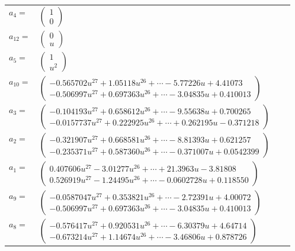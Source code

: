 \documentclass[1p]{elsarticle_modified}
\theoremstyle{definition}
\begin{document}
\begin{tabular}{m{7pt} m{180pt} m{7pt} m{180pt} }
\flushright $a_{4}=$&$\begin{pmatrix}1\\0\end{pmatrix}$ \\
\flushright $a_{12}=$&$\begin{pmatrix}0\\u\end{pmatrix}$ \\
\flushright $a_{5}=$&$\begin{pmatrix}1\\u^2\end{pmatrix}$ \\
\flushright $a_{10}=$&$\begin{pmatrix}-0.565702 u^{27}+1.05118 u^{26}+\cdots-5.77226 u+4.41073\\-0.506997 u^{27}+0.697363 u^{26}+\cdots-3.04835 u+0.410013\end{pmatrix}$ \\
\flushright $a_{3}=$&$\begin{pmatrix}-0.104193 u^{27}+0.658612 u^{26}+\cdots-9.55638 u+0.700265\\-0.0157737 u^{27}+0.222925 u^{26}+\cdots+0.262195 u-0.371218\end{pmatrix}$ \\
\flushright $a_{2}=$&$\begin{pmatrix}-0.321907 u^{27}+0.668581 u^{26}+\cdots-8.81393 u+0.621257\\-0.235371 u^{27}+0.587360 u^{26}+\cdots-0.371007 u+0.0542399\end{pmatrix}$ \\
\flushright $a_{1}=$&$\begin{pmatrix}0.407606 u^{27}-3.01277 u^{26}+\cdots+21.3963 u-3.81808\\0.526919 u^{27}-1.24495 u^{26}+\cdots-0.0602728 u+0.118550\end{pmatrix}$ \\
\flushright $a_{9}=$&$\begin{pmatrix}-0.0587047 u^{27}+0.353821 u^{26}+\cdots-2.72391 u+4.00072\\-0.506997 u^{27}+0.697363 u^{26}+\cdots-3.04835 u+0.410013\end{pmatrix}$ \\
\flushright $a_{8}=$&$\begin{pmatrix}-0.576417 u^{27}+0.920531 u^{26}+\cdots-6.30379 u+4.64714\\-0.673214 u^{27}+1.14674 u^{26}+\cdots-3.46806 u+0.878726\end{pmatrix}$ \\

\end{tabular}
\end{document}
